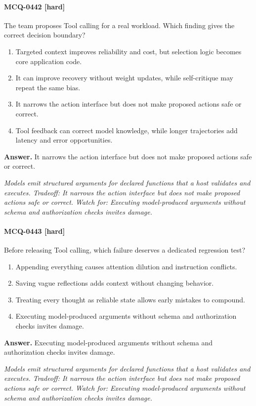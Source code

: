 \paragraph{MCQ-0442 [hard]} The team proposes Tool calling for a real workload. Which finding gives the correct decision boundary?
\begin{enumerate}[label=\Alph*.]
\item Targeted context improves reliability and cost, but selection logic becomes core application code.
\item It can improve recovery without weight updates, while self-critique may repeat the same bias.
\item It narrows the action interface but does not make proposed actions safe or correct.
\item Tool feedback can correct model knowledge, while longer trajectories add latency and error opportunities.
\end{enumerate}
\noindent\textbf{Answer.} It narrows the action interface but does not make proposed actions safe or correct.
\par\textit{Models emit structured arguments for declared functions that a host validates and executes. Tradeoff: It narrows the action interface but does not make proposed actions safe or correct. Watch for: Executing model-produced arguments without schema and authorization checks invites damage.}
\paragraph{MCQ-0443 [hard]} Before releasing Tool calling, which failure deserves a dedicated regression test?
\begin{enumerate}[label=\Alph*.]
\item Appending everything causes attention dilution and instruction conflicts.
\item Saving vague reflections adds context without changing behavior.
\item Treating every thought as reliable state allows early mistakes to compound.
\item Executing model-produced arguments without schema and authorization checks invites damage.
\end{enumerate}
\noindent\textbf{Answer.} Executing model-produced arguments without schema and authorization checks invites damage.
\par\textit{Models emit structured arguments for declared functions that a host validates and executes. Tradeoff: It narrows the action interface but does not make proposed actions safe or correct. Watch for: Executing model-produced arguments without schema and authorization checks invites damage.}
